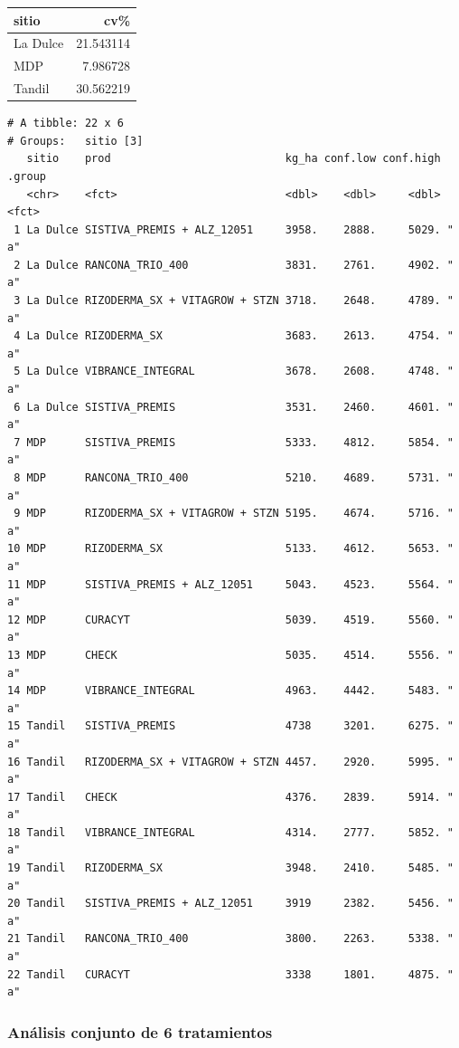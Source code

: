 \documentclass[
  letterpaper,
  DIV=11,
  numbers=noendperiod]{scrartcl}
\begin{document}
\begin{longtable}[]{@{}lr@{}}
\toprule()
sitio & cv\% \\
\midrule()
\endhead
La Dulce & 21.543114 \\
MDP & 7.986728 \\
Tandil & 30.562219 \\
\bottomrule()
\end{longtable}

\begin{verbatim}
# A tibble: 22 x 6
# Groups:   sitio [3]
   sitio    prod                           kg_ha conf.low conf.high .group
   <chr>    <fct>                          <dbl>    <dbl>     <dbl> <fct> 
 1 La Dulce SISTIVA_PREMIS + ALZ_12051     3958.    2888.     5029. " a"  
 2 La Dulce RANCONA_TRIO_400               3831.    2761.     4902. " a"  
 3 La Dulce RIZODERMA_SX + VITAGROW + STZN 3718.    2648.     4789. " a"  
 4 La Dulce RIZODERMA_SX                   3683.    2613.     4754. " a"  
 5 La Dulce VIBRANCE_INTEGRAL              3678.    2608.     4748. " a"  
 6 La Dulce SISTIVA_PREMIS                 3531.    2460.     4601. " a"  
 7 MDP      SISTIVA_PREMIS                 5333.    4812.     5854. " a"  
 8 MDP      RANCONA_TRIO_400               5210.    4689.     5731. " a"  
 9 MDP      RIZODERMA_SX + VITAGROW + STZN 5195.    4674.     5716. " a"  
10 MDP      RIZODERMA_SX                   5133.    4612.     5653. " a"  
11 MDP      SISTIVA_PREMIS + ALZ_12051     5043.    4523.     5564. " a"  
12 MDP      CURACYT                        5039.    4519.     5560. " a"  
13 MDP      CHECK                          5035.    4514.     5556. " a"  
14 MDP      VIBRANCE_INTEGRAL              4963.    4442.     5483. " a"  
15 Tandil   SISTIVA_PREMIS                 4738     3201.     6275. " a"  
16 Tandil   RIZODERMA_SX + VITAGROW + STZN 4457.    2920.     5995. " a"  
17 Tandil   CHECK                          4376.    2839.     5914. " a"  
18 Tandil   VIBRANCE_INTEGRAL              4314.    2777.     5852. " a"  
19 Tandil   RIZODERMA_SX                   3948.    2410.     5485. " a"  
20 Tandil   SISTIVA_PREMIS + ALZ_12051     3919     2382.     5456. " a"  
21 Tandil   RANCONA_TRIO_400               3800.    2263.     5338. " a"  
22 Tandil   CURACYT                        3338     1801.     4875. " a"  
\end{verbatim}

\hypertarget{anuxe1lisis-conjunto-de-6-tratamientos-2}{%
\subsubsection{Análisis conjunto de 6
tratamientos}\label{anuxe1lisis-conjunto-de-6-tratamientos-2}}
\end{document}
